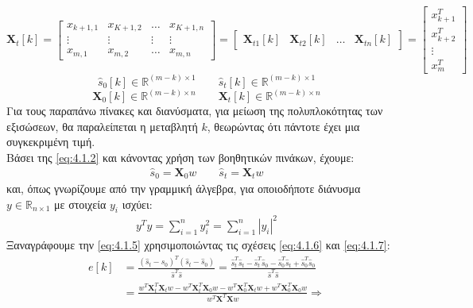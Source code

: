 $$
 \mathbf{X}_{t}[k] = \begin{bmatrix} 
                x_{k+1,1} & x_{K+1,2} & \ldots & x_{K+1,n} \\
                \vdots & \vdots & \vdots & \vdots \\
                x_{m,1} & x_{m,2} & \ldots & x_{m,n}
                \end{bmatrix} = 
                \begin{bmatrix}
                \mathbf{X}_{t1}[k] & \mathbf{X}_{t2}[k] & \ldots & 
                \mathbf{X}_{tn}[k]
                \end{bmatrix} =
                \begin{bmatrix}
                x_{k+1}^T \\ x_{k+2}^T \\ \vdots \\ x_{m}^T
                \end{bmatrix}
$$
$$
\hat{s}_0[k] \in \mathbb{R}^{(m-k)\times 1} \qquad \hat{s}_t[k] \in \mathbb{R}^{(m-k)\times 1}  
$$
$$
\mathbf{X}_0[k] \in \mathbb{R}^{(m-k)\times n} \qquad \mathbf{X}_t[k] \in \mathbb{R}^{(m-k)\times n}
$$
Για τους παραπάνω πίνακες και διανύσματα, για μείωση της πολυπλοκότητας των εξισώσεων, θα παραλείπεται η μεταβλητή $k$, θεωρώντας ότι πάντοτε έχει μια συγκεκριμένη τιμή.
\\
Βάσει της \eqref{eq:4.1.2} και κάνοντας χρήση των βοηθητικών πινάκων, έχουμε:
\begin{align} \label{eq:4.1.6}
    \hat{s}_0 = \mathbf{X}_0 w \qquad \hat{s}_t = \mathbf{X}_t w
\end{align}
και, όπως γνωρίζουμε από την γραμμική άλγεβρα, για οποιοδήποτε διάνυσμα $y \in \mathbb{R}_{n\times 1}$ με στοιχεία $y_i$ ισχύει:
\begin{align} \label{eq:4.1.7}
    y^Ty = \sum_{i=1}^{n} y_i^2 = \sum_{i=1}^{n} \left | y_i \right |^2
\end{align}
Ξαναγράφουμε την \eqref{eq:4.1.5} χρησιμοποιώντας τις σχέσεις \eqref{eq:4.1.6} και \eqref{eq:4.1.7}:
\begin{equation*}
\begin{split}
e[k] &= \frac{(\hat{s}_t - \hat{s}_0)^T (\hat{s}_t - \hat{s}_0)}{\hat{s}^T \hat{s}} =
\frac{\hat{s}_t^T \hat{s}_t - \hat{s}_t^T \hat{s}_0 - \hat{s}_0^T \hat{s}_t + \hat{s}_0^T \hat{s}_0} {\hat{s}^T \hat{s}} \\
&= \frac{w^T\mathbf{X}_t^T\mathbf{X}_t w
 - w^T\mathbf{X}_t^T\mathbf{X}_0 w
 - w^T\mathbf{X}_0^T\mathbf{X}_t w
 + w^T\mathbf{X}_0^T\mathbf{X}_0 w}
 {w^T\mathbf{X}^T\mathbf{X}w} \Rightarrow \\
\end{split}
\end{equation*}

